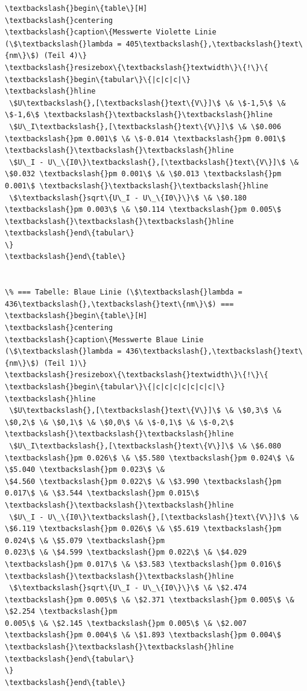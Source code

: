 \begin{Verbatim}[commandchars=\\\{\}]
\textbackslash{}begin\{table\}[H]
\textbackslash{}centering
\textbackslash{}caption\{Messwerte Violette Linie (\$\textbackslash{}lambda = 405\textbackslash{},\textbackslash{}text\{nm\}\$) (Teil 4)\}
\textbackslash{}resizebox\{\textbackslash{}textwidth\}\{!\}\{
\textbackslash{}begin\{tabular\}\{|c|c|c|\}
\textbackslash{}hline
 \$U\textbackslash{},[\textbackslash{}text\{V\}]\$ \& \$-1,5\$ \& \$-1,6\$ \textbackslash{}\textbackslash{}\textbackslash{}hline
 \$U\_I\textbackslash{},[\textbackslash{}text\{V\}]\$ \& \$0.006 \textbackslash{}pm 0.001\$ \& \$-0.014 \textbackslash{}pm 0.001\$ \textbackslash{}\textbackslash{}\textbackslash{}hline
 \$U\_I - U\_\{I0\}\textbackslash{},[\textbackslash{}text\{V\}]\$ \& \$0.032 \textbackslash{}pm 0.001\$ \& \$0.013 \textbackslash{}pm 0.001\$ \textbackslash{}\textbackslash{}\textbackslash{}hline
 \$\textbackslash{}sqrt\{U\_I - U\_\{I0\}\}\$ \& \$0.180 \textbackslash{}pm 0.003\$ \& \$0.114 \textbackslash{}pm 0.005\$ \textbackslash{}\textbackslash{}\textbackslash{}hline
\textbackslash{}end\{tabular\}
\}
\textbackslash{}end\{table\}


\% === Tabelle: Blaue Linie (\$\textbackslash{}lambda = 436\textbackslash{},\textbackslash{}text\{nm\}\$) ===
\textbackslash{}begin\{table\}[H]
\textbackslash{}centering
\textbackslash{}caption\{Messwerte Blaue Linie (\$\textbackslash{}lambda = 436\textbackslash{},\textbackslash{}text\{nm\}\$) (Teil 1)\}
\textbackslash{}resizebox\{\textbackslash{}textwidth\}\{!\}\{
\textbackslash{}begin\{tabular\}\{|c|c|c|c|c|c|c|\}
\textbackslash{}hline
 \$U\textbackslash{},[\textbackslash{}text\{V\}]\$ \& \$0,3\$ \& \$0,2\$ \& \$0,1\$ \& \$0,0\$ \& \$-0,1\$ \& \$-0,2\$ \textbackslash{}\textbackslash{}\textbackslash{}hline
 \$U\_I\textbackslash{},[\textbackslash{}text\{V\}]\$ \& \$6.080 \textbackslash{}pm 0.026\$ \& \$5.580 \textbackslash{}pm 0.024\$ \& \$5.040 \textbackslash{}pm 0.023\$ \&
\$4.560 \textbackslash{}pm 0.022\$ \& \$3.990 \textbackslash{}pm 0.017\$ \& \$3.544 \textbackslash{}pm 0.015\$ \textbackslash{}\textbackslash{}\textbackslash{}hline
 \$U\_I - U\_\{I0\}\textbackslash{},[\textbackslash{}text\{V\}]\$ \& \$6.119 \textbackslash{}pm 0.026\$ \& \$5.619 \textbackslash{}pm 0.024\$ \& \$5.079 \textbackslash{}pm
0.023\$ \& \$4.599 \textbackslash{}pm 0.022\$ \& \$4.029 \textbackslash{}pm 0.017\$ \& \$3.583 \textbackslash{}pm 0.016\$ \textbackslash{}\textbackslash{}\textbackslash{}hline
 \$\textbackslash{}sqrt\{U\_I - U\_\{I0\}\}\$ \& \$2.474 \textbackslash{}pm 0.005\$ \& \$2.371 \textbackslash{}pm 0.005\$ \& \$2.254 \textbackslash{}pm
0.005\$ \& \$2.145 \textbackslash{}pm 0.005\$ \& \$2.007 \textbackslash{}pm 0.004\$ \& \$1.893 \textbackslash{}pm 0.004\$ \textbackslash{}\textbackslash{}\textbackslash{}hline
\textbackslash{}end\{tabular\}
\}
\textbackslash{}end\{table\}


\end{Verbatim}
